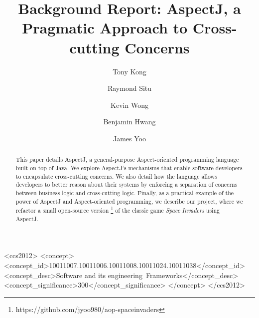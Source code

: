 \documentclass[sigconf]{acmart}
\begin{document}
\title{Background Report: AspectJ, a Pragmatic Approach to Cross-cutting Concerns}

\author{Tony Kong}

\author{Raymond Situ}

\author{Kevin Wong}

\author{Benjamin Hwang}

\author{James Yoo}

\begin{abstract}
This paper details AspectJ, a general-purpose Aspect-oriented programming language built on top of Java. We explore AspectJ's mechanisms that enable software developers to encapsulate cross-cutting concerns. We also detail how the language allows developers to better reason about their systems by enforcing a separation of concerns between business logic and cross-cutting logic. Finally, as a practical example of the power of AspectJ and Aspect-oriented programming, we describe our project, where we refactor a small open-source version \footnote{https://github.com/jyoo980/aop-spaceinvaders} of the classic game \textit{Space Invaders} using AspectJ.
\end{abstract}

\begin{CCSXML}
<ccs2012>
<concept>
<concept_id>10011007.10011006.10011008.10011024.10011038</concept_id>
<concept_desc>Software and its engineering~Frameworks</concept_desc>
<concept_significance>300</concept_significance>
</concept>
</ccs2012>
\end{CCSXML}

\maketitle
\end{document}
